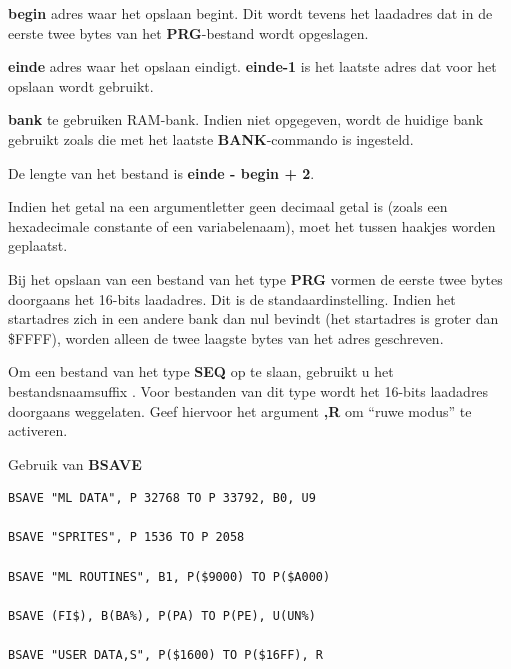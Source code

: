 \begin{description}[leftmargin=2cm,style=nextline]
{\bf begin} adres waar het opslaan begint. Dit wordt tevens het laadadres dat in de eerste twee bytes van het {\bf PRG}-bestand wordt opgeslagen.

{\bf einde} adres waar het opslaan eindigt. {\bf einde-1} is het laatste adres dat voor het opslaan wordt gebruikt.

                  {\bf bank} te gebruiken RAM-bank. Indien niet opgegeven, wordt de huidige bank gebruikt zoals die met het laatste {\bf BANK}-commando is ingesteld.

                  \drivedefinition

                  \unitdefinition

\item [Opmerkingen:]  De lengte van het bestand is {\bf einde - begin + 2}.

                  Indien het getal na een argumentletter geen decimaal getal is (zoals een hexadecimale constante of een variabelenaam), moet het tussen haakjes worden geplaatst.

                  Bij het opslaan van een bestand van het type {\bf PRG} vormen de eerste twee bytes doorgaans het 16-bits laadadres. Dit is de standaardinstelling. Indien het startadres zich in een andere bank dan nul bevindt (het startadres is groter dan \$FFFF), worden alleen de twee laagste bytes van het adres geschreven.

                  Om een bestand van het type {\bf SEQ} op te slaan, gebruikt u het bestandsnaamsuffix . Voor bestanden van dit type wordt het 16-bits laadadres doorgaans weggelaten. Geef hiervoor het argument {\bf ,R} om ``ruwe modus'' te activeren.

\item [Voorbeelden:] Gebruik van {\bf BSAVE}

\begin{tcolorbox}[colback=black,coltext=white]
\verbatimfont{\codefont}
\begin{verbatim}
BSAVE "ML DATA", P 32768 TO P 33792, B0, U9

BSAVE "SPRITES", P 1536 TO P 2058

BSAVE "ML ROUTINES", B1, P($9000) TO P($A000)

BSAVE (FI$), B(BA%), P(PA) TO P(PE), U(UN%)

BSAVE "USER DATA,S", P($1600) TO P($16FF), R
\end{verbatim}
\end{tcolorbox}
\end{description}

